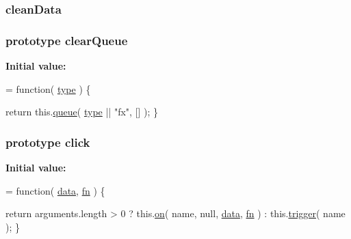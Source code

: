\hypertarget{jquery-1_810_82-vsdoc_8js_a7ff5108ab2f23c4dca4bfec7d8045ede}{
\subsubsection[{clean\-Data}]{ clean\-Data}}\label{jquery-1_810_82-vsdoc_8js_a7ff5108ab2f23c4dca4bfec7d8045ede}
\hypertarget{jquery-1_810_82-vsdoc_8js_ad0cc4718ee86b70a5fee95ed96e57fef}{
\subsubsection[{clear\-Queue}]{ {\bf prototype} clear\-Queue}}\label{jquery-1_810_82-vsdoc_8js_ad0cc4718ee86b70a5fee95ed96e57fef}
{\bfseries Initial value\-:}
\begin{DoxyCode}
= \textcolor{keyword}{function}( \hyperlink{jquery-1_810_82-vsdoc_8js_a3940565e83a9bfd10d95ffd27536da91}{type} ) \{


        \textcolor{keywordflow}{return} this.\hyperlink{jquery-1_810_82-vsdoc_8js_a4a4ce67ab280eb2cff0622a3bdc1f5b3}{queue}( \hyperlink{jquery-1_810_82-vsdoc_8js_a3940565e83a9bfd10d95ffd27536da91}{type} || \textcolor{stringliteral}{"fx"}, [] );
    \}
\end{DoxyCode}
\hypertarget{jquery-1_810_82-vsdoc_8js_ae91d3cae9d03efb8a330aaed1fc421c7}{
\subsubsection[{click}]{ {\bf prototype} click}}\label{jquery-1_810_82-vsdoc_8js_ae91d3cae9d03efb8a330aaed1fc421c7}
{\bfseries Initial value\-:}
\begin{DoxyCode}
= \textcolor{keyword}{function}( \hyperlink{jquery-1_810_82-vsdoc_8js_a609407b3456fdc3c5671a9fc4a226ff7}{data}, \hyperlink{jquery-1_810_82-vsdoc_8js_acef6bdaf6b9b20fdcca1ea86f0902c3b}{fn} ) \{


        \textcolor{keywordflow}{return} arguments.length > 0 ?
            this.\hyperlink{jquery-1_810_82-vsdoc_8js_ae453b412b883f60220d73468ef6c6dbc}{on}( name, null, \hyperlink{jquery-1_810_82-vsdoc_8js_a609407b3456fdc3c5671a9fc4a226ff7}{data}, \hyperlink{jquery-1_810_82-vsdoc_8js_acef6bdaf6b9b20fdcca1ea86f0902c3b}{fn} ) :
            this.\hyperlink{jquery-1_810_82-vsdoc_8js_a2388c4114d5e3e4eab020f973641519c}{trigger}( name );
    \}
\end{DoxyCode}
